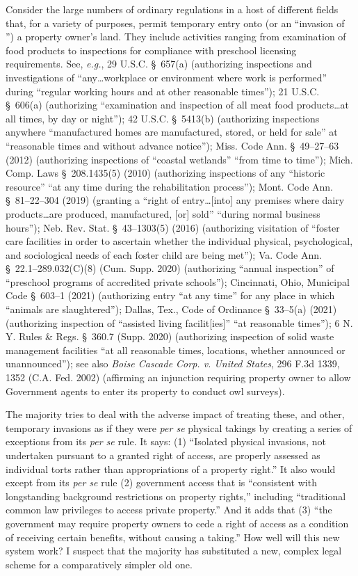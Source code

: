 Consider the large numbers of ordinary regulations in a host of different fields
that, for a variety of purposes, permit temporary entry onto (or an ``invasion
of '') a property owner's land. They include activities ranging from examination
of food products to inspections for compliance with preschool licensing
requirements. See, \textit{e.g.}, 29 U.S.C. \S~657(a) (authorizing inspections
and investigations of ``any\ldots workplace or environment where work is
performed'' during ``regular working hours and at other reasonable times''); 21
U.S.C. \S~606(a) (authorizing ``examination and inspection of all meat food
products\ldots at all times, by day or night''); 42 U.S.C. \S~5413(b)
(authorizing inspections anywhere ``manufactured homes are manufactured, stored,
or held for sale'' at ``reasonable times and without advance notice''); Miss.
Code Ann. \S~49--27--63 (2012) (authorizing inspections of ``coastal wetlands''
``from time to time''); Mich. Comp. Laws \S~208.1435(5) (2010) (authorizing
inspections of any ``historic resource'' ``at any time during the rehabilitation
process''); Mont. Code Ann. \S~81--22--304 (2019) (granting a ``right of
entry\ldots [into] any premises where dairy products\ldots are produced,
manufactured, [or] sold'' ``during normal business hours''); Neb. Rev. Stat.
\S~43--1303(5) (2016) (authorizing visitation of ``foster care facilities in
order to ascertain whether the individual physical, psychological, and
sociological needs of each foster child are being met''); Va. Code Ann.
\S~22.1--289.032(C)(8) (Cum. Supp. 2020) (authorizing ``annual inspection'' of
``preschool programs of accredited private schools''); Cincinnati, Ohio,
Municipal Code \S~603--1 (2021) (authorizing entry ``at any time'' for any place
in which ``animals are slaughtered''); Dallas, Tex., Code of Ordinance
\S~33--5(a) (2021) (authorizing inspection of ``assisted living facilit[ies]''
``at reasonable times''); 6 N. Y. Rules \& Regs. \S~360.7 (Supp. 2020)
(authorizing inspection of solid waste management facilities ``at all reasonable
times, locations, whether announced or unannounced''); see also \textit{Boise
Cascade Corp. v. United States}, 296 F.3d 1339, 1352 (C.A. Fed. 2002) (affirming
an injunction requiring property owner to allow Government agents to enter its
property to conduct owl surveys).


The majority tries to deal with the adverse impact of treating these, and other,
temporary invasions as if they were \textit{per se} physical takings by creating
a series of exceptions from its \textit{per se} rule. It says: (1) ``Isolated
physical invasions, not undertaken pursuant to a granted right of access, are
properly assessed as individual torts rather than appropriations of a property
right.'' It also would except from its \textit{per se} rule (2) government
access that is ``consistent with longstanding background restrictions on
property rights,'' including ``traditional common law privileges to access
private property.'' And it adds that (3) ``the government may require property
owners to cede a right of access as a condition of receiving certain benefits,
without causing a taking.'' How well will this new system work? I suspect that
the majority has substituted a new, complex legal scheme for a comparatively
simpler old one.


